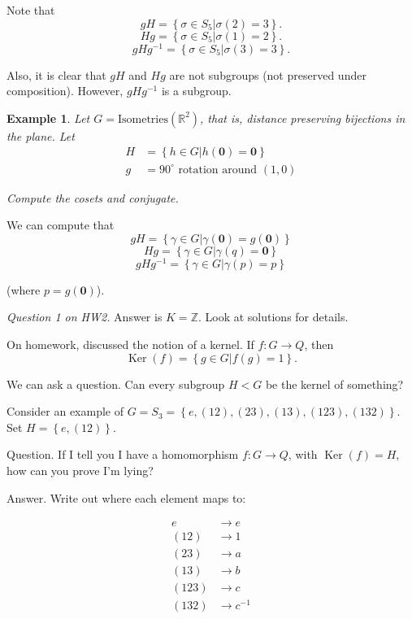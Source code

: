 \documentclass[12pt]{article}
\newtheorem*{example}{Example}
\newcommand{\RR}{\mathbb{R}}
\newcommand{\mbf}{\mathbf}
\DeclareMathOperator{\Ker}{Ker}
\def\ZZ{\mathbb{Z}}
\begin{document}
Note that 
\[
  gH = \left\{ \sigma \in S_5 | \sigma(2) = 3 \right\}.
\]
\[
  Hg = \left\{ \sigma \in S_5 | \sigma(1) = 2 \right\}.
\]
\[
  gHg^{-1} = \left\{ \sigma \in S_5 | \sigma(3) = 3 \right\}.
\]

Also, it is clear that $gH$ and $Hg$ are not subgroups (not preserved under composition).  However, $gHg^{-1}$ is a subgroup.

\begin{example}
 
  Let $G = \text{Isometries}(\RR^2)$, that is, distance preserving bijections in the plane.  Let
  \begin{align*}
    H &= \left\{ h \in G | h(\mbf{0}) = \mbf{0} \right\} \\
    g &= 90^{\circ} \text{ rotation around }  (1, 0)
  \end{align*}

  Compute the cosets and conjugate.
\end{example}

We can compute that
\[
  gH = \left\{ \gamma \in G | \gamma (\mbf{0}) = g(\mbf{0}) \right\}
\]
\[
  Hg = \left\{ \gamma \in G | \gamma(q) = \mbf{0} \right\}
\]
\[
  gHg^{-1} = \left\{ \gamma \in G | \gamma(p) = p \right\}
\]

(where $p = g(\mbf{0})$).

{\it Question 1 on HW2.} Answer is $K = \ZZ$.  Look at solutions for details.

On homework, discussed the notion of a kernel.  If $f: G \to Q$, then
\[
  \Ker (f) = \left\{ g \in G | f(g) = 1 \right\}.
\]

We can ask a question.  Can every subgroup $H < G$ be the kernel of something?


Consider an example of $G = S_3 = \left\{ e, (1 2), (2 3), (1 3), (1 2 3), (1 3 2) \right\}$.  Set $H = \left\{ e, (1 2) \right\}.$

Question.  If I tell you I have a homomorphism $f: G \to Q$, with $\Ker (f) = H$, how can you prove I'm lying?

Answer. Write out where each element maps to:

\begin{align*}
  e & \to e \\
  (1 2) & \to 1 \\
  (2 3) & \to a \\
  (1 3) & \to b \\
  (1 2 3) & \to c \\
  (1 3 2) & \to c^{-1}
\end{align*}
\end{document}

